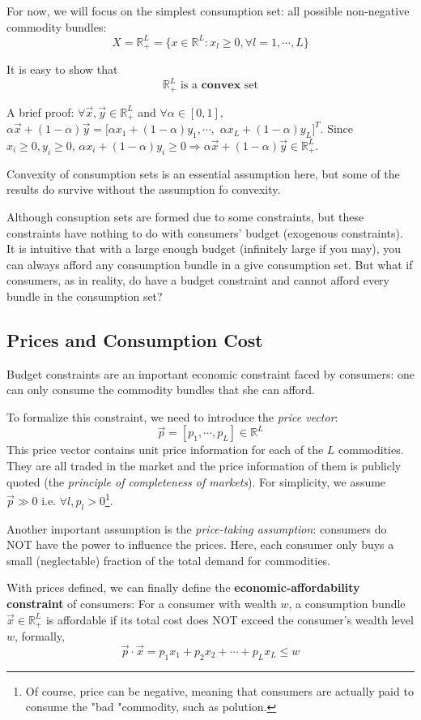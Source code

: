 For now, we will focus on the simplest consumption set: all possible non-negative commodity bundles:
$$X=\mathbb{R}^L_+=\{x\in \mathbb{R}^L: x_l\geq 0,\forall l=1,\cdots, L\}$$

It is easy to show that
$$\mathbb{R}^L_+ \text{ is a }\textbf{convex} \text{ set}$$

A brief proof: $\forall \vec{x},\vec{y}\in \mathbb{R}^L_+$ and $\forall\alpha \in [0,1]$, $\alpha\vec{x}+(1-\alpha)\vec{y}=[\alpha x_1+(1-\alpha)y_1,\cdots,$ $\alpha x_L+(1-\alpha)y_L]^T$. Since $x_i\geq 0,y_i\geq 0$, $\alpha x_i+(1-\alpha)y_i\geq 0 \Rightarrow\alpha\vec{x}+(1-\alpha)\vec{y}\in \mathbb{R}^L_+$.

Convexity of consumption sets is an essential assumption here, but some of the results do survive without the assumption fo convexity.

Although consuption sets are formed due to some constraints, but these constraints have nothing to do with consumers' budget (exogenous constraints). It is intuitive that with a large enough budget (infinitely large if you may), you can always afford any consumption bundle in a give consumption set. But what if consumers, as in reality, do have a budget constraint and cannot afford every bundle in the consumption set?

\subsection{Prices and Consumption Cost}
Budget constraints are an important economic constraint faced by consumers: one can only consume the commodity bundles that she can afford.

To formalize this constraint, we need to introduce the \textit{price vector}: 
$$\vec{p}=\left[p_1,\cdots,p_L\right]\in \mathbb{R}^L$$
This price vector contains unit price information for each of the $L$ commodities. They are all traded in the market and the price information of them is publicly quoted (the \textit{principle of completeness of markets}).
For simplicity, we assume $\vec{p}\gg 0$ i.e. $\forall l,p_l>0$\footnote{Of course, price can be negative, meaning that consumers are actually paid to consume the "bad "commodity, such as polution.}.

Another important assumption is the \textit{price-taking assumption}: consumers do NOT have the power to influence the prices. Here, each consumer only buys a small (neglectable) fraction of the total demand for commodities.

With prices defined, we can finally define the \textbf{economic-affordability constraint} of consumers: For a consumer with wealth $w$, a consumption bundle $\vec{x}\in \mathbb{R}^L_+$ is affordable if its total cost does NOT exceed the consumer's wealth level $w$, formally, $$\vec{p}\cdot \vec{x}=p_1x_1+p_2x_2+\cdots+p_Lx_L\leq w$$
